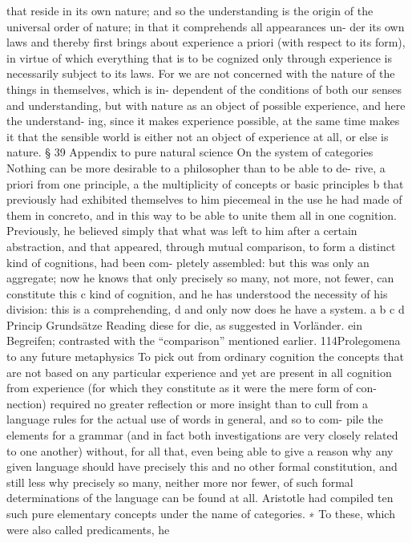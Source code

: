 that reside in its own nature; and so the understanding is the origin of
the universal order of nature; in that it comprehends all appearances un-
der its own laws and thereby ﬁrst brings about experience a priori (with
respect to its form), in virtue of which everything that is to be cognized
only through experience is necessarily subject to its laws. For we are
not concerned with the nature of the things in themselves, which is in-
dependent of the conditions of both our senses and understanding, but
with nature as an object of possible experience, and here the understand-
ing, since it makes experience possible, at the same time makes it that
the sensible world is either not an object of experience at all, or else is
nature.
§ 39
Appendix to pure natural science
On the system of categories
Nothing can be more desirable to a philosopher than to be able to de-
rive, a priori from one principle, a the multiplicity of concepts or basic
principles b that previously had exhibited themselves to him piecemeal
in the use he had made of them in concreto, and in this way to be able to
unite them all in one cognition. Previously, he believed simply that what
was left to him after a certain abstraction, and that appeared, through
mutual comparison, to form a distinct kind of cognitions, had been com-
pletely assembled: but this was only an aggregate; now he knows that
only precisely so many, not more, not fewer, can constitute this c kind of
cognition, and he has understood the necessity of his division: this is a
comprehending, d and only now does he have a system.
a
b
c
d
Princip
Grundsätze
Reading diese for die, as suggested in Vorländer.
ein Begreifen; contrasted with the “comparison” mentioned earlier.
114Prolegomena to any future metaphysics
To pick out from ordinary cognition the concepts that are not based
on any particular experience and yet are present in all cognition from
experience (for which they constitute as it were the mere form of con-
nection) required no greater reﬂection or more insight than to cull from
a language rules for the actual use of words in general, and so to com-
pile the elements for a grammar (and in fact both investigations are very
closely related to one another) without, for all that, even being able to
give a reason why any given language should have precisely this and no
other formal constitution, and still less why precisely so many, neither
more nor fewer, of such formal determinations of the language can be
found at all.
Aristotle had compiled ten such pure elementary concepts under the
name of categories. ∗ To these, which were also called predicaments, he
